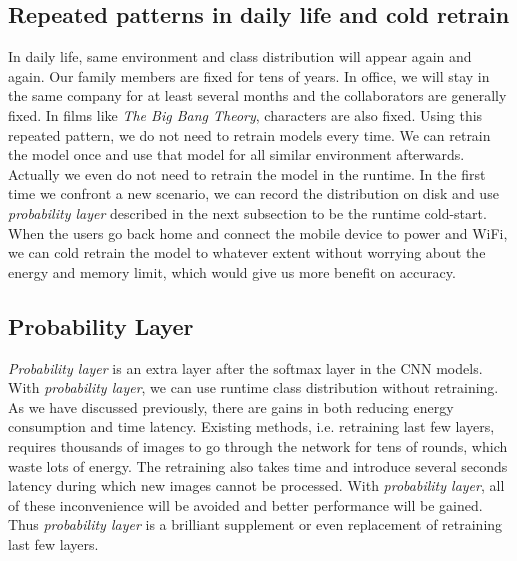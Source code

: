 \documentclass[conference]{IEEEtran}
\begin{document}
\begin{spacing}{0.9}
\subsection{Repeated patterns in daily life and cold retrain}
In daily life, same environment and class distribution will appear again and again. Our family members are fixed for tens of years. In office, we will stay in the same company for at least several months and the collaborators are generally fixed. In films like \textit{The Big Bang Theory}, characters are also fixed. Using this repeated pattern, we do not need to retrain models every time. We can retrain the model once and use that model for all similar environment afterwards. Actually we even do not need to retrain the model in the runtime. In the first time we confront a new scenario, we can record the distribution on disk and use \textit{probability layer} described in the next subsection to be the runtime cold-start. When the users go back home and connect the mobile device to power and WiFi, we can cold retrain the model to whatever extent without worrying about the energy and memory limit, which would give us more benefit on accuracy.




\subsection{Probability Layer}
\textit{Probability layer} is an extra layer after the softmax layer in the CNN models. With \textit{probability layer}, we can use runtime class distribution without retraining. As we have discussed previously, there are gains in both reducing energy consumption and time latency. Existing methods, i.e. retraining last few layers, requires thousands of images to go through the network for tens of rounds, which waste lots of energy. The retraining also takes time and introduce several seconds latency during which new images cannot be processed. With \textit{probability layer}, all of these inconvenience will be avoided and better performance will be gained. Thus \textit{probability layer} is a brilliant supplement or even replacement of retraining last few layers.


\end{spacing}
\end{document}
